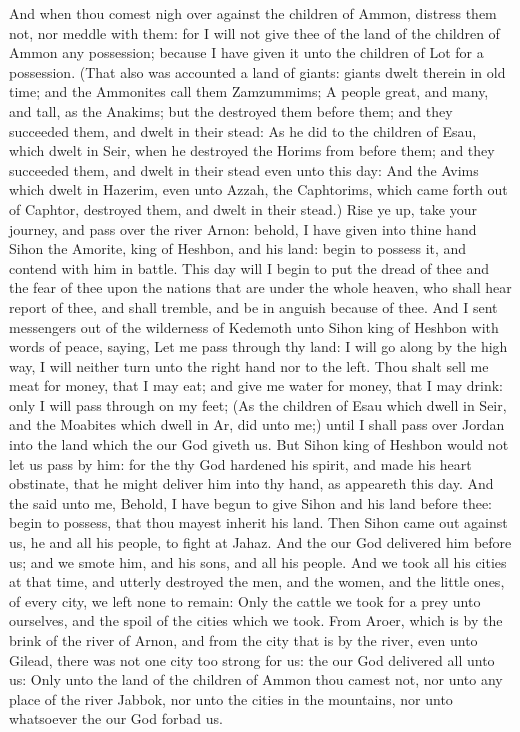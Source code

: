 \begin{biblechapter}
\verse And when thou comest nigh over against the children of Ammon, distress them not, nor meddle with them: for I will not give thee of the land of the children of Ammon any possession; because I have given it unto the children of Lot for a possession.
\verse (That also was accounted a land of giants: giants dwelt therein in old time; and the Ammonites call them Zamzummims;
\verse A people great, and many, and tall, as the Anakims; but the \LORD destroyed them before them; and they succeeded them, and dwelt in their stead:
\verse As he did to the children of Esau, which dwelt in Seir, when he destroyed the Horims from before them; and they succeeded them, and dwelt in their stead even unto this day:
\verse And the Avims which dwelt in Hazerim, even unto Azzah, the Caphtorims, which came forth out of Caphtor, destroyed them, and dwelt in their stead.)
 Rise ye up, take your journey, and pass over the river Arnon: behold, I have given into thine hand Sihon the Amorite, king of Heshbon, and his land: begin to possess it, and contend with him in battle.
\verse This day will I begin to put the dread of thee and the fear of thee upon the nations that are under the whole heaven, who shall hear report of thee, and shall tremble, and be in anguish because of thee.
\verse And I sent messengers out of the wilderness of Kedemoth unto Sihon king of Heshbon with words of peace, saying,
\verse Let me pass through thy land: I will go along by the high way, I will neither turn unto the right hand nor to the left.
\verse Thou shalt sell me meat for money, that I may eat; and give me water for money, that I may drink: only I will pass through on my feet;
\verse (As the children of Esau which dwell in Seir, and the Moabites which dwell in Ar, did unto me;) until I shall pass over Jordan into the land which the \LORD our God giveth us.
\verse But Sihon king of Heshbon would not let us pass by him: for the \LORD thy God hardened his spirit, and made his heart obstinate, that he might deliver him into thy hand, as appeareth this day.
\verse And the \LORD said unto me, Behold, I have begun to give Sihon and his land before thee: begin to possess, that thou mayest inherit his land.
\verse Then Sihon came out against us, he and all his people, to fight at Jahaz.
\verse And the \LORD our God delivered him before us; and we smote him, and his sons, and all his people.
\verse And we took all his cities at that time, and utterly destroyed the men, and the women, and the little ones, of every city, we left none to remain:
\verse Only the cattle we took for a prey unto ourselves, and the spoil of the cities which we took.
\verse From Aroer, which is by the brink of the river of Arnon, and from the city that is by the river, even unto Gilead, there was not one city too strong for us: the \LORD our God delivered all unto us:
\verse Only unto the land of the children of Ammon thou camest not, nor unto any place of the river Jabbok, nor unto the cities in the mountains, nor unto whatsoever the \LORD our God forbad us.
\end{biblechapter}

